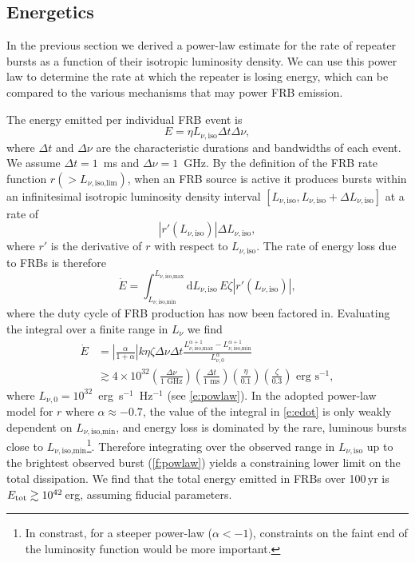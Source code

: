 \documentclass[twocolumn]{aastex6}
\newcommand{\dd}{\ensuremath{\text{d}}}
\newcommand{\Lnil}{\ensuremath{L_{\nu,\text{iso,lim}}}}
\begin{document}
\subsection{Energetics}

In the previous section we derived a power-law estimate for the rate of repeater bursts as a function of their isotropic luminosity density. We can use this power law to determine the rate at which the repeater is losing energy, which can be compared to the various mechanisms that may power FRB emission.

The energy emitted per individual FRB event is
\begin{equation}
E = \eta L_{\nu,\text{iso}} \Delta t \Delta \nu,
\end{equation}
where $\Delta t$ and $\Delta \nu$ are the characteristic durations and bandwidths of each event. We assume $\Delta t = 1$~ms and $\Delta \nu = 1$~GHz. By the definition of the FRB rate function $r({>}\Lnil)$, when an FRB source is active it produces bursts within an infinitesimal isotropic luminosity density interval $[L_{\nu,\text{iso}}, L_{\nu,\text{iso}} + \Delta L_{\nu,\text{iso}}]$ at a rate of
\begin{equation}
|r'(L_{\nu,\text{iso}})| \Delta L_{\nu,\text{iso}},
\end{equation} 
where $r'$ is the derivative of $r$ with respect to $L_{\nu,\text{iso}}$. The rate of energy loss due to FRBs is therefore
\begin{equation}
\dot E = \int_{L_{\nu,\text{iso,min}}}^{L_{\nu,\text{iso,max}}} \dd L_{\nu,\text{iso}} \, E \zeta |r'(L_{\nu,\text{iso}})|,
\end{equation}
where the duty cycle of FRB production has now been factored in. Evaluating the integral over a finite range in $L_\nu$ we find
\begin{align}
\dot E &= 
  \left|\frac{\alpha}{1 + \alpha}\right|
  k \eta \zeta \Delta \nu \Delta t
  \frac{L_{\nu,\text{iso,max}}^{\alpha + 1} - L_{\nu,  
    \text{iso,min}}^{\alpha + 1}}{L_{\nu,0}^\alpha} \nonumber \\
& \gtrsim 4 \times 10^{32}
  \left(\frac{\Delta\nu}{1\text{ GHz}}\right)
  \left(\frac{\Delta t}{1\text{ ms}}\right)
  \left(\frac{\eta}{0.1}\right)
  \left(\frac{\zeta}{0.3}\right)
  \text{ erg s}^{-1},
\label{e:edot}
\end{align}
where $L_{\nu,0} = 10^{32}$~erg~s$^{-1}$~Hz$^{-1}$ (see \autoref{e:powlaw}). In the adopted power-law model for $r$ where $\alpha \approx -0.7$, the value of the integral in \autoref{e:edot} is only weakly dependent on $L_{\nu,\text{iso,min}}$, and energy loss is dominated by the rare, luminous bursts close to $L_{\nu,\text{iso,min}}$\footnote{In constrast, for a steeper power-law ($\alpha<-1$), constraints on the faint end of the luminosity function would be more important.}. Therefore integrating over the observed range in $L_{\nu,\text{iso}}$ up to the brightest observed burst (\autoref{f:powlaw}) yields a constraining lower limit on the total dissipation.
We find that the total energy emitted in FRBs over 100\,yr is $E_{\rm tot} \gtrsim 10^{42}$\,erg, assuming fiducial parameters.
\end{document}
